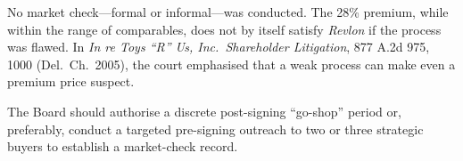 No market check---formal or informal---was conducted.  The 28\% premium, while within the range of comparables, does not by itself satisfy \textit{Revlon} if the process was flawed.  In \textit{In re Toys ``R'' Us, Inc.\ Shareholder Litigation}, 877 A.2d 975, 1000 (Del.\ Ch.\ 2005), the court emphasised that a weak process can make even a premium price suspect.

The Board should authorise a discrete post-signing ``go-shop'' period or, preferably, conduct a targeted pre-signing outreach to two or three strategic buyers to establish a market-check record.

\vspace{10pt}

